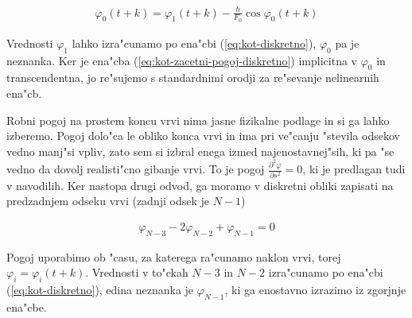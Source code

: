 \documentclass[a4paper,10pt]{article}
\renewcommand{\phi}{\varphi}
\newcommand{\parcdva}[2]{
  \frac{\partial^2 #1}{\partial #2 ^2}
}
\begin{document}
\begin{align}
 \label{eq:kot-zacetni-pogoj-diskretno}
 \phi_0(t+k) = \phi_1(t+k) - \frac{h}{F_0} \cos \phi_0(t+k)
\end{align}

Vrednosti $\phi_1$ lahko izra"cunamo po ena"cbi (\ref{eq:kot-diskretno}), $\phi_0$ pa je neznanka. Ker je ena"cba (\ref{eq:kot-zacetni-pogoj-diskretno}) implicitna v $\phi_0$ in transcendentna, jo re"sujemo s standardnimi orodji za re"sevanje nelinearnih ena"cb. 

Robni pogoj na prostem koncu vrvi nima jasne fizikalne podlage in si ga lahko izberemo. Pogoj dolo"ca le obliko konca vrvi in ima pri ve"canju "stevila odsekov vedno manj"si vpliv, zato sem si izbral enega izmed najenostavnej"sih, ki pa "se vedno da dovolj realisti"cno gibanje vrvi. To je pogoj $\parcdva{\phi}{s}=0$, ki je predlagan tudi v navodilih. Ker nastopa drugi odvod, ga moramo v diskretni obliki zapisati na predzadnjem odseku vrvi (zadnji odsek je $N-1$)

\begin{align}
 \phi_{N-3} -2\phi_{N-2} + \phi_{N-1} = 0
\end{align}

Pogoj uporabimo ob "casu, za katerega ra"cunamo naklon vrvi, torej $\phi_i = \phi_i(t+k)$. Vrednosti v to"ckah $N-3$ in $N-2$ izra"cunamo po ena"cbi (\ref{eq:kot-diskretno}), edina neznanka je $\phi_{N-1}$, ki ga enostavno izrazimo iz zgorjnje ena"cbe. 
\end{document}
